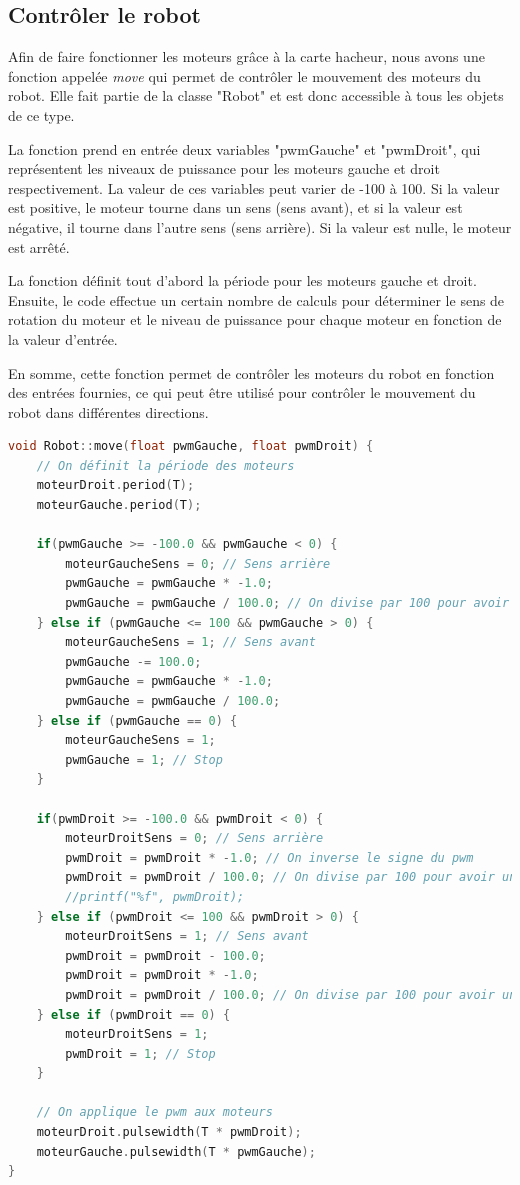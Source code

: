 \subsection{Contrôler le robot}

Afin de faire fonctionner les moteurs grâce à la carte hacheur, nous avons une fonction appelée \emph{move} qui permet de contrôler le mouvement des moteurs du robot. Elle fait partie de la classe "Robot" et est donc accessible à tous les objets de ce type.

La fonction prend en entrée deux variables "pwmGauche" et "pwmDroit", qui représentent les niveaux de puissance pour les moteurs gauche et droit respectivement. La valeur de ces variables peut varier de -100 à 100. Si la valeur est positive, le moteur tourne dans un sens (sens avant), et si la valeur est négative, il tourne dans l'autre sens (sens arrière). Si la valeur est nulle, le moteur est arrêté.

La fonction définit tout d'abord la période pour les moteurs gauche et droit. Ensuite, le code effectue un certain nombre de calculs pour déterminer le sens de rotation du moteur et le niveau de puissance pour chaque moteur en fonction de la valeur d'entrée.

En somme, cette fonction permet de contrôler les moteurs du robot en fonction des entrées fournies, ce qui peut être utilisé pour contrôler le mouvement du robot dans différentes directions.

\begin{lstlisting}[language={C++}, caption={Fonction move()}, label={robot.cpp}]
void Robot::move(float pwmGauche, float pwmDroit) {
    // On définit la période des moteurs
    moteurDroit.period(T);
    moteurGauche.period(T);

    if(pwmGauche >= -100.0 && pwmGauche < 0) {
        moteurGaucheSens = 0; // Sens arrière
        pwmGauche = pwmGauche * -1.0;
        pwmGauche = pwmGauche / 100.0; // On divise par 100 pour avoir un pwm entre 0 et 1
    } else if (pwmGauche <= 100 && pwmGauche > 0) {
        moteurGaucheSens = 1; // Sens avant
        pwmGauche -= 100.0;
        pwmGauche = pwmGauche * -1.0;
        pwmGauche = pwmGauche / 100.0;
    } else if (pwmGauche == 0) {
        moteurGaucheSens = 1;
        pwmGauche = 1; // Stop
    }

    if(pwmDroit >= -100.0 && pwmDroit < 0) {
        moteurDroitSens = 0; // Sens arrière
        pwmDroit = pwmDroit * -1.0; // On inverse le signe du pwm
        pwmDroit = pwmDroit / 100.0; // On divise par 100 pour avoir un pwm entre 0 et 1
        //printf("%f", pwmDroit);
    } else if (pwmDroit <= 100 && pwmDroit > 0) {
        moteurDroitSens = 1; // Sens avant
        pwmDroit = pwmDroit - 100.0; 
        pwmDroit = pwmDroit * -1.0;
        pwmDroit = pwmDroit / 100.0; // On divise par 100 pour avoir un pwm entre 0 et 1
    } else if (pwmDroit == 0) {
        moteurDroitSens = 1;
        pwmDroit = 1; // Stop
    }

    // On applique le pwm aux moteurs
    moteurDroit.pulsewidth(T * pwmDroit);
    moteurGauche.pulsewidth(T * pwmGauche);
}

\end{lstlisting}


